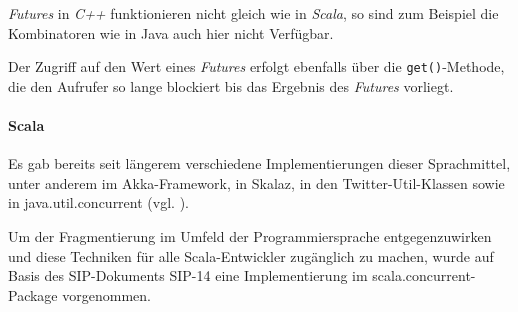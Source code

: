 \emph{Futures} in \emph{C++} funktionieren nicht gleich wie in
\emph{Scala}, so sind zum Beispiel die Kombinatoren wie in Java auch 
hier nicht Verfügbar.

Der Zugriff auf den Wert eines \emph{Futures} erfolgt ebenfalls über die
\texttt{get()}-Methode, die den Aufrufer so lange blockiert bis
das Ergebnis des \emph{Futures} vorliegt.

\paragraph{Scala} Es gab bereits seit längerem verschiedene 
Implementierungen dieser Sprachmittel,
unter anderem im Akka-Framework, in Skalaz, in den Twitter-Util-Klassen sowie
in java.util.concurrent (vgl. \cite{futuresTry}).

Um der Fragmentierung im Umfeld der Programmiersprache entgegenzuwirken und
diese Techniken für alle Scala-Entwickler zugänglich zu machen, wurde auf Basis
des SIP-Dokuments SIP-14 eine Implementierung im scala.concurrent-Package
vorgenommen.
